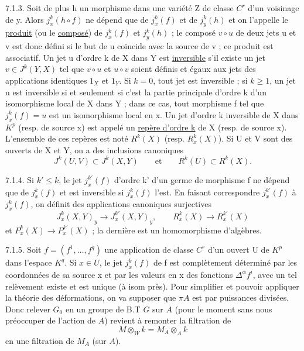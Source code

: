 7.1.3. Soit de plus h un morphisme dans une variété Z de classe $C^r$ d'un voisinage de y. Alors $j_x^k(h\circ f)$ ne dépend que de $j_x^k(f)$ et de $j_y^k(h)$ et on l'appelle le \uline{produit} (ou le \uline{composé}) de $j_x^k(f)$ et $j_y^k(h)$ ; le composé $v\circ u$ de deux jets u et v est donc défini si le but de u coïncide avec la source de v ; ce produit est associatif. Un jet u d'ordre k de X dans Y est \uline{inversible} s'il existe un jet $v\in J^k(Y,X)$ tel que $v\circ u$ et $u\circ v$ soient définis et égaux aux jets des applications identiques $1_X$ et $1_Y$. Si $k=0$, tout jet est inversible ; si $k\geq1$, un jet u est inversible si et seulement si c'est la partie principale d'ordre k d'un isomorphisme local de X dans Y ; dans ce cas, tout morphisme f tel que $j_x^k(f)=u$ est un isomorphisme local en x. Un jet d'ordre k inversible de X dans $K^p$ (resp. de source x) est appelé un \uline{repère d'ordre k} de X (resp. de source x). L'ensemble de ces repères est noté $R^k(X)$ (resp. $R_x^k(X)$). Si U et V sont des ouverts de X et Y, on a des inclusions canoniques
\[
J^k(U,V)\subset J^k(X,Y)\qquad\text{et}\qquad R^k(U)\subset R^k(X).
\]

7.1.4. Si $k'\leq k$, le jet $j_x^{k'}(f)$ d'ordre k' d'un germe de morphisme f ne dépend que de $j_x^k(f)$ et est inversible si $j_x^k(f)$ l'est. En faisant correspondre $j_x^{k'}(f)$ à $j_x^k(f)$, on définit des applications canoniques surjectives
\[
J_x^k(X,Y)_y\longrightarrow J_x^{k'}(X,Y)_y,\qquad
R_x^k(X)\longrightarrow R_x^{k'}(X)
\]
et $P_x^k(X)\longrightarrow P_x^{k'}(X)$ ; la dernière est un homomorphisme d'algèbres.

7.1.5. Soit $f=(f^1,\ldots,f^q)$ une application de classe $C^r$ d'un ouvert U de $K^p$ dans l'espace $K^q$. Si $x\in U$, le jet $j_x^k(f)$ de f est complètement déterminé par les coordonnées de sa source x et par les valeurs en x des fonctions $\Delta^\alpha f^i$, avec
un tel relèvement existe et est unique (à isom  près).  Pour simplifier et pouvoir appliquer la théorie des déformations, on va supposer que $\pi A$ est  par puissances divisées. Donc relever $G_0$ en un groupe de B.T $G$ sur $A$ (pour le moment sans nous préoccuper de l'action de $A$) revient à remonter la filtration de
\[
M\otimes_W k=M_A\otimes_A k
\]
en une filtration de $M_A$ (sur $A$).


